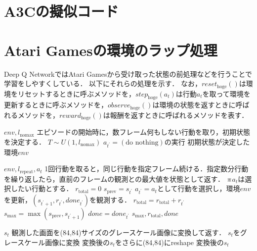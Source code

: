 \documentclass{jarticle}
\begin{document}
\section{A3Cの擬似コード}

\section{Atari Gamesの環境のラップ処理}
Deep Q NetworkではAtari Gamesから受け取った状態の前処理などを行うことで学習をしやすくしている．
以下にそれらの処理を示す．
なお，$reset_{\mathrm{hoge}}()$は環境をリセットするときに呼ぶメソッドを，$step_{\mathrm{hoge}}(a_t)$は行動$a_t$を取って環境を更新するときに呼ぶメソッドを，$observe_{\mathrm{hoge}}()$は環境の状態を返すときに呼ばれるメソッドを，$reward_{\mathrm{hoge}}()$は報酬を返すときに呼ばれるメソッドを表す．
\begin{algorithm}[htb]
\caption{$reset_{\mathrm{noop}}()$}
\label{alg:noop_reset}                          
\begin{algorithmic}[1]   
\REQUIRE $env, l_{\mathrm{nomax}}$
\STATE エピソードの開始時に，数フレーム何もしない行動を取り，初期状態を決定する．
\STATE $T\sim U(1,l_{\mathrm{nomax}})$
\STATE $a_{t^{\prime}}=(\mbox{do nothing})$の実行
\ENDFOR
\ENSURE 初期状態が決定した環境$env$
\end{algorithmic}
\end{algorithm}

\begin{algorithm}[tb]
\caption{$step_{\mathrm{repeat}}(a_t)$}
\label{alg:max_and_skip}                          
\begin{algorithmic}[1]   
\REQUIRE $env, l_{\mathrm{repeat}}, a_t$
\STATE 1回行動を取ると，同じ行動を指定フレーム続ける．指定数分行動を繰り返したら，直前のフレームの観測との最大値を状態として返す．
\STATE ※$a_t$は選択したい行動とする．
\STATE $r_{\mathrm{total}}=0$
\STATE $s_{\mathrm{prev}}=s_{t^{\prime}}$
\STATE $a_{t^{\prime}}=a_t$として行動を選択し，環境$env$を更新，$(s_{t^{\prime}+1},r_{t^{\prime}}, done_{t^{\prime}})$を観測する．
\STATE $r_{\mathrm{total}}=r_{\mathrm{total}}+r_{t^{\prime}}$
\STATE $s_{\mathrm{max}}=\max(s_{\mathrm{prev}}, s_{t^{\prime}+1})$
\STATE $done=done_{t^{\prime}}$
\ENDFOR
\ENSURE $s_{\mathrm{max}}, r_{\mathrm{total}}, done$
\end{algorithmic}
\end{algorithm}

\begin{algorithm}[tb]
\caption{$observe_{\mathrm{gray84}}()$}
\label{alg:process_frame84}                          
\begin{algorithmic}[1]   
\REQUIRE $s_t$
\STATE 観測した画面を(84,84)サイズのグレースケール画像に変換して返す．
\STATE $s_t$をグレースケール画像に変換
\STATE 変換後の$s_t$をさらに(84,84)にreshape
\ENSURE 変換後の$s_t$
\end{algorithmic}
\end{algorithm}
\end{document}
